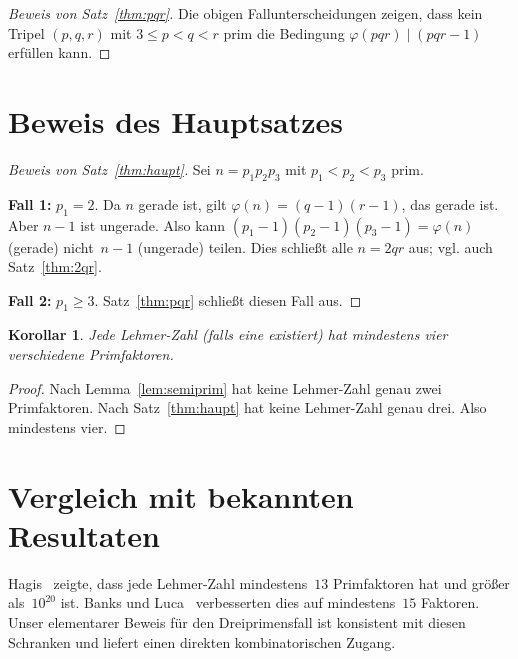 \documentclass[12pt,a4paper]{amsart}
\newtheorem{corollary}[theorem]{Korollar}
\theoremstyle{definition}
\newcommand{\euler}{\varphi}
\begin{document}
\begin{proof}[Beweis von Satz~\ref{thm:pqr}]
Die obigen Fallunterscheidungen zeigen, dass kein Tripel $(p, q, r)$ mit $3 \le p < q < r$
prim die Bedingung $\euler(pqr) \mid (pqr - 1)$ erfüllen kann. \qedhere
\end{proof}

\section{Beweis des Hauptsatzes}

\begin{proof}[Beweis von Satz~\ref{thm:haupt}]
Sei $n = p_1 p_2 p_3$ mit $p_1 < p_2 < p_3$ prim.

\textbf{Fall 1:} $p_1 = 2$. Da $n$ gerade ist, gilt $\euler(n) = (q-1)(r-1)$, das gerade ist.
Aber $n - 1$ ist ungerade. Also kann $(p_1-1)(p_2-1)(p_3-1) = \euler(n)$ (gerade) nicht~$n-1$ (ungerade) teilen.
Dies schließt alle $n = 2qr$ aus; vgl. auch Satz~\ref{thm:2qr}.

\textbf{Fall 2:} $p_1 \ge 3$. Satz~\ref{thm:pqr} schließt diesen Fall aus.
\end{proof}

\begin{corollary}
\label{cor:vierprim}
Jede Lehmer-Zahl (falls eine existiert) hat mindestens \emph{vier}
verschiedene Primfaktoren.
\end{corollary}

\begin{proof}
Nach Lemma~\ref{lem:semiprim} hat keine Lehmer-Zahl genau zwei Primfaktoren.
Nach Satz~\ref{thm:haupt} hat keine Lehmer-Zahl genau drei. Also mindestens vier.
\end{proof}

\section{Vergleich mit bekannten Resultaten}

Hagis~\cite{Hagis1988} zeigte, dass jede Lehmer-Zahl mindestens~$13$ Primfaktoren
hat und größer als~$10^{20}$ ist. Banks und Luca~\cite{Banks2009} verbesserten dies
auf mindestens~$15$ Faktoren. Unser elementarer Beweis für den Dreiprimensfall ist
konsistent mit diesen Schranken und liefert einen direkten kombinatorischen Zugang.
\end{document}
